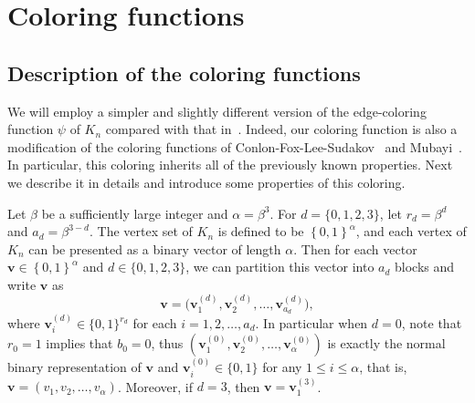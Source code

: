 \documentclass[11pt]{article}
\theoremstyle{definition}
\begin{document}
\section{Coloring functions}\label{sec:ColoringFunction}
\subsection{Description of the coloring functions}

 We will employ a simpler and slightly different version of the edge-coloring function $\psi$ of $K_{n}$ compared with that in~\cite{2023CPC6688}. Indeed, our coloring function is also a modification of the coloring functions of Conlon-Fox-Lee-Sudakov~\cite{2015PLMSCFLS} and Mubayi~\cite{1998Mubayi43}. In particular, this coloring inherits all of the previously known properties. Next we describe it in details and introduce some properties of this coloring.

Let $\beta$ be a sufficiently large integer and $\alpha=\beta^{3}$. For $d=\{0,1,2,3\}$, let $r_{d}=\beta^{d}$ and $a_{d}=\beta^{3-d}$. The vertex set of $K_{n}$ is defined to be $\left\{0,1\right\}^\alpha$, and each vertex of $K_n$ can be presented as a binary vector of length $\alpha$. Then for each vector $\boldsymbol{v}\in \left\{0,1 \right\}^{\alpha}$ and $d\in\{0,1,2,3\}$, we can partition this vector into $a_{d}$ blocks and write $\boldsymbol{v}$ as 
\begin{equation*}
    \boldsymbol{v}=\big(\boldsymbol{v}_{1}^{(d)},\boldsymbol{v}_2^{(d)},\ldots,\boldsymbol{v}_{a_{d}}^{(d)}\big),
\end{equation*}
where $\boldsymbol{v}_{i}^{(d)}\in\{0,1\}^{r_{d}}$ for each $i=1,2,\ldots,a_{d}$. In particular when $d=0$, note that $r_{0}=1$ implies that $b_{0}=0$, thus $(\boldsymbol{v}_{1}^{(0)},\boldsymbol{v}_2^{(0)},\ldots,\boldsymbol{v}_{\alpha}^{(0)})$ is exactly the normal binary representation of $\boldsymbol{v}$ and $\boldsymbol{v}_{i}^{(0)}\in\{0,1\}$ for any $1\le i\le\alpha$, that is, $\boldsymbol{v}=(v_{1},v_{2},\ldots,v_{\alpha})$. Moreover, if $d=3$, then $\boldsymbol{v}=\boldsymbol{v}_{1}^{(3)}$.
\end{document}
